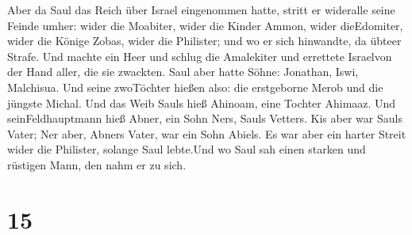 Aber da Saul das Reich über Israel eingenommen hatte, stritt er
wideralle seine Feinde umher: wider die Moabiter, wider die Kinder
Ammon, wider dieEdomiter, wider die Könige Zobas, wider die Philister;
und wo er sich hinwandte, da übteer Strafe.  Und machte ein
Heer und schlug die Amalekiter und errettete Israelvon der Hand aller,
die sie zwackten.  Saul aber hatte Söhne: Jonathan, Iswi,
Malchisua. Und seine zwoTöchter hießen also: die erstgeborne Merob und
die jüngste Michal.  Und das Weib Sauls hieß Ahinoam, eine
Tochter Ahimaaz. Und seinFeldhauptmann hieß Abner, ein Sohn Ners, Sauls
Vetters.  Kis aber war Sauls Vater; Ner aber, Abners Vater,
war ein Sohn Abiels.  Es war aber ein harter Streit wider
die Philister, solange Saul lebte.Und wo Saul sah einen starken und
rüstigen Mann, den nahm er zu sich.

\hypertarget{section-14}{%
\section{15}\label{section-14}}

